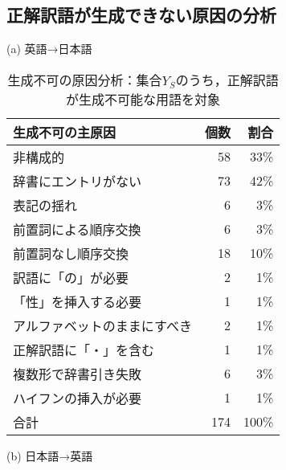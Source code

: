 \documentclass[japanese]{jnlp_1.3a}
\begin{document}
\subsection{正解訳語が生成できない原因の分析}
\label{sec:seiseifuka_analysis}


\begin{table}[p]
 \small
 \centering
 \caption{生成不可の原因分析：集合$Y_S$のうち，正解訳語が生成不可能な用語を対象}
 \label{tab:seiseifuka}
 (a) 英語→日本語
\vspace{4pt}

 \begin{tabular}{|l|r|r|}
  \hline
  生成不可の主原因 & 個数 & 割合 \\
  \hline
  非構成的 & 58 & 33\%\\
  辞書にエントリがない & 73 & 42\%\\
  表記の揺れ & 6 & 3\%\\
  前置詞による順序交換 & 6 & 3\%\\
  前置詞なし順序交換 & 18 & 10\%\\
  訳語に「の」が必要 & 2 & 1\%\\
  「性」を挿入する必要 & 1 & 1\%\\
  アルファベットのままにすべき & 2 &1\%\\
  正解訳語に「・」を含む & 1 & 1\%\\
  複数形で辞書引き失敗 & 6 & 3\%\\
  ハイフンの挿入が必要 & 1 & 1\%\\
  \hline
  合計 & 174& 100\%\\
  \hline
 \end{tabular}

     \vspace{\baselineskip}
 (b) 日本語→英語
\vspace{4pt}


\end{table}
\end{document}
